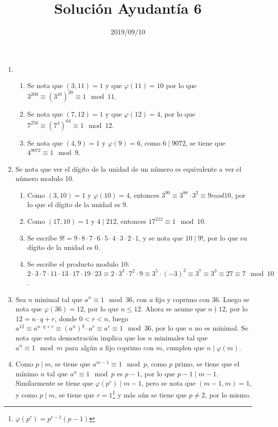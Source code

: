\documentclass{ayudantia}
\title{Solución Ayudantía 6}
\date{2019/09/10}
\begin{document}
\maketitle
\begin{enumerate}
    \item \begin{enumerate}
        \item Se nota que \((3,11)=1\) y que \(\varphi(11)=10\) por lo que \(3^{200}\equiv(3^{10})^20\equiv 1\mod 11\).
        \item Se nota que \((7,12)=1\) y que \(\varphi(12)=4\), por lo que \(7^{256}\equiv (7^4)^{64}\equiv 1\mod 12\).
        \item Se nota que \((4,9)=1\) y \(\varphi(9)=6\), como \(6\mid 9072\), se tiene que \(4^{9072}\equiv 1\mod 9\).
    \end{enumerate}
    \item Se nota que ver el dígito de la unidad de un número es equivalente a ver el número modulo 10.
    \begin{enumerate}
        \item Como \((3,10)=1\) y \(\varphi(10)=4\), entonces \(3^{90}\equiv3^{88}\cdot 3^2\equiv 9 mod 10\), por lo que el dígito de la unidad es \(9\).
        \item Como \((17,10)=1\) y \(4\mid 212\), entonces \(17^{212}\equiv 1\mod 10\).
        \item Se escribe \(9!=9\cdot 8\cdot 7\cdot 6\cdot 5\cdot 4\cdot 3\cdot 2\cdot 1\), y se nota que \(10\mid 9!\), por lo que su dígito de la unidad es \(0\).
        \item Se escribe el producto modulo 10: \(2\cdot 3\cdot 7\cdot 11\cdot 13\cdot 17\cdot 19\cdot 23\equiv 2\cdot 3^3\cdot 7^2\cdot 9\equiv 3^5\cdot (-3)^2\equiv 3^7\equiv 3^3\equiv 27\equiv 7\mod 10\).
    \end{enumerate}
    \item Sea \(n\) minimal tal que \(a^n\equiv 1\mod 36\), con \(a\) fijo y coprimo con \(36\). Luego se nota que \(\varphi(36)=12\), por lo que \(n\leq 12\). Ahora se asume que \(n\nmid 12\), por lo \(12=n\cdot q+r\), donde \(0<r<n\), luego \(a^{12}\equiv a^{n\cdot q+r}\equiv (a^{n})^q\cdot a^r\equiv a^r\equiv 1\mod 36\), por lo que \(n\) no es minimal. Se nota que esta demostración implica que los \(n\) minimales tal que \(a^n\equiv 1\mod m\) para algún \(a\) fijo coprimo con \(m\), cumplen que \(n\mid \varphi(m)\).
    \item Como \(p\mid m\), se tiene que \(a^{m-1}\equiv 1\mod p\), como \(p\) primo, se tiene que el mínimo \(n\) tal que \(a^n\equiv 1\mod p\) es \(p-1\), por lo que \(p-1\mid m-1\). Similarmente se tiene que \(\varphi(p^r)\mid m-1\), pero se nota que \((m-1,m)=1\), y como \(p\mid m\), se tiene que \(r=1\)\footnote{\(\varphi(p^r)=p^{r-1}(p-1)\)} y más aún se tiene que \(p\neq 2\), por lo mismo.
\end{enumerate}
\end{document}
